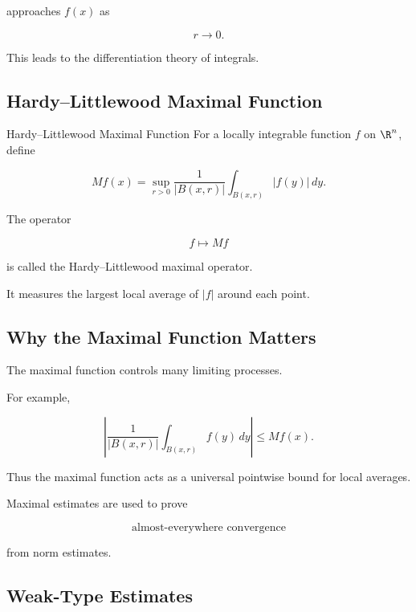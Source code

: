 approaches \(f(x)\) as

\[
r\to0.
\]

This leads to the differentiation theory of integrals.

\subsection{Hardy--Littlewood Maximal Function}
\label{subsec:hardy-littlewood-maximal}

\begin{definitionbox}{Hardy--Littlewood Maximal Function}
For a locally integrable function \(f\) on \(\R^n\), define

\[
\boxed{
Mf(x)
=
\sup_{r>0}
\frac{1}{|B(x,r)|}
\int_{B(x,r)}
|f(y)|\,dy.
}
\]
\end{definitionbox}

The operator

\[
f\mapsto Mf
\]

is called the Hardy--Littlewood maximal operator.

It measures the largest local average of \(|f|\) around each point.

\subsection{Why the Maximal Function Matters}
\label{subsec:why-maximal-function}

The maximal function controls many limiting processes.

For example,

\[
\left|
\frac{1}{|B(x,r)|}
\int_{B(x,r)}
f(y)\,dy
\right|
\leq
Mf(x).
\]

Thus the maximal function acts as a universal pointwise bound for local
averages.

Maximal estimates are used to prove

\[
\boxed{
\text{almost-everywhere convergence}
}
\]

from norm estimates.

\subsection{Weak-Type Estimates}
\label{subsec:weak-type-estimates}

